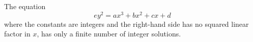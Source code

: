\begin{proposition}\label{eq:058}
    The equation
\[
    ey^2=ax^3+bx^2+cx+d
\]
    where the constants are integers and the right-hand side has no squared linear factor in $x$, has only a finite number of integer solutions.
\end{proposition}
